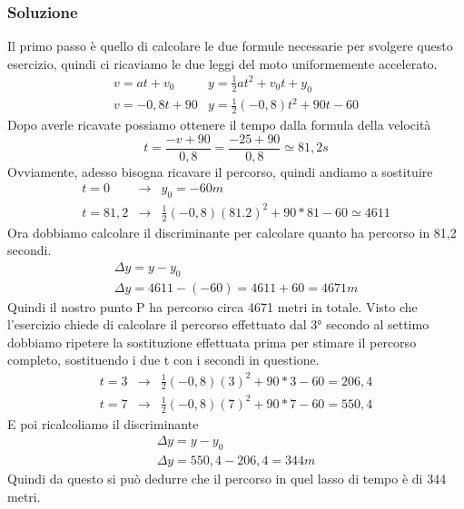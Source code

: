 \subsubsection{Soluzione}
Il primo passo è quello di calcolare le due formule necessarie per svolgere
questo esercizio, quindi ci ricaviamo le due leggi del moto uniformemente
accelerato.
\begin{equation*}
	\begin{matrix}
		v=at+v_0&y=\frac{1}{2}at^2+v_0t+y_0\\
		v=-0,8t+90&y=\frac{1}{2}\left(-0,8\right)t^2+90t-60
	\end{matrix}
\end{equation*}
Dopo averle ricavate possiamo ottenere il tempo dalla formula della velocità
\begin{equation*}
	t=\frac{-v+90}{0,8}=\frac{-25+90}{0,8}\simeq81,2s
\end{equation*}
Ovviamente, adesso bisogna ricavare il percorso, quindi andiamo a sostituire
\begin{equation*}
	\begin{matrix}
		t=0&\to&y_0=-60m\\
		t=81,2&\to&\frac{1}{2}\left(-0,8\right)(81.2)^2+90*81-60\simeq 4611
	\end{matrix}
\end{equation*}
Ora dobbiamo calcolare il discriminante per calcolare quanto ha percorso in
81,2 secondi.
\begin{equation*}
	\begin{matrix}
		\Delta y=y-y_0\\
		\Delta y=4611-(-60)=4611+60=4671m
	\end{matrix}
\end{equation*}
Quindi il nostro punto P ha percorso circa 4671 metri in totale.
Visto che l'esercizio chiede di calcolare il percorso effettuato dal 3° secondo
al settimo dobbiamo ripetere la sostituzione effettuata prima per stimare il
percorso completo, sostituendo i due t con i secondi in questione.
\begin{equation*}
	\begin{matrix}
		t=3&\to&\frac{1}{2}\left(-0,8\right)(3)^2+90*3-60=206,4\\
		t=7&\to&\frac{1}{2}\left(-0,8\right)(7)^2+90*7-60=550,4
	\end{matrix}
\end{equation*}
E poi ricalcoliamo il discriminante
\begin{equation*}
	\begin{matrix}
		\Delta y=y-y_0\\
		\Delta y=550,4-206,4=344m
	\end{matrix}
\end{equation*}
Quindi da questo si può dedurre che il percorso in quel lasso di tempo è di 344
metri.
